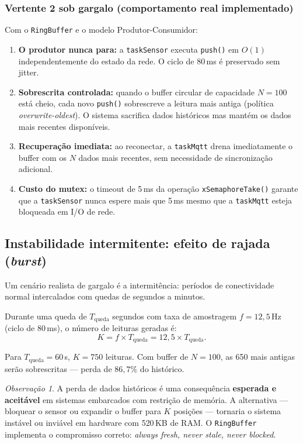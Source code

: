 \documentclass[12pt, a4paper]{article}
\theoremstyle{definition}
\theoremstyle{remark}
\newtheorem{observacao}{Observação}
\begin{document}
\subsubsection{Vertente 2 sob gargalo (comportamento real implementado)}

Com o \texttt{RingBuffer} e o modelo Produtor-Consumidor:

\begin{enumerate}
  \item \textbf{O produtor nunca para:} a \texttt{taskSensor} executa
    \texttt{push()} em $O(1)$ independentemente do estado da rede.
    O ciclo de 80\,ms é preservado sem jitter.

  \item \textbf{Sobrescrita controlada:} quando o buffer circular de
    capacidade $N = 100$ está cheio, cada novo \texttt{push()} sobrescreve
    a leitura mais antiga (política \emph{overwrite-oldest}). O sistema
    sacrifica dados históricos mas mantém os dados mais recentes disponíveis.

  \item \textbf{Recuperação imediata:} ao reconectar, a \texttt{taskMqtt}
    drena imediatamente o buffer com os $N$ dados mais recentes,
    sem necessidade de sincronização adicional.

  \item \textbf{Custo do mutex:} o timeout de 5\,ms da operação
    \texttt{xSemaphoreTake()} garante que a \texttt{taskSensor} nunca
    espere mais que 5\,ms mesmo que a \texttt{taskMqtt} esteja bloqueada
    em I/O de rede.
\end{enumerate}

\subsection{Instabilidade intermitente: efeito de rajada (\emph{burst})}

Um cenário realista de gargalo é a intermitência: períodos de conectividade
normal intercalados com quedas de segundos a minutos.

Durante uma queda de $T_{\text{queda}}$ segundos com taxa de amostragem
$f = 12{,}5$\,Hz (ciclo de 80\,ms), o número de leituras geradas é:
\[
  K = f \times T_{\text{queda}} = 12{,}5 \times T_{\text{queda}}.
\]

Para $T_{\text{queda}} = 60$\,s, $K = 750$ leituras. Com buffer de $N=100$,
as 650 mais antigas serão sobrescritas — perda de $86{,}7\%$ do histórico.

\begin{observacao}
  A perda de dados históricos é uma consequência \textbf{esperada e
  aceitável} em sistemas embarcados com restrição de memória. A alternativa
  — bloquear o sensor ou expandir o buffer para $K$ posições — tornaria o
  sistema instável ou inviável em hardware com 520\,KB de RAM. O
  \texttt{RingBuffer} implementa o compromisso correto: \emph{always fresh,
  never stale, never blocked}.
\end{observacao}
\end{document}
